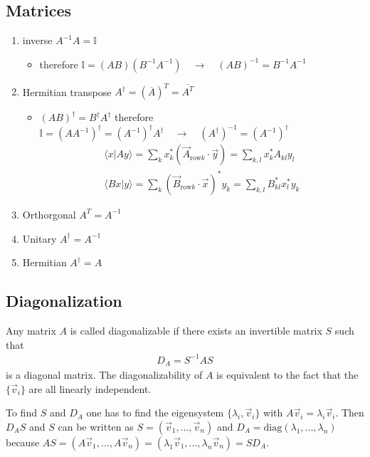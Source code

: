 \documentclass[10pt,a4paper]{article}
\theoremstyle{definition}
\begin{document}
\subsection{Matrices}
\begin{enumerate}
    \item inverse $A^{-1}A=\mathbb{I}$
    \begin{itemize}
        \item therefore $\mathbb{I}=(AB)(B^{-1}A^{-1})\quad\rightarrow\quad (AB)^{-1}=B^{-1}A^{-1}$
    \end{itemize}
    \item Hermitian transpose $A^\dagger = (\overline{A})^T = \overline{A^T}$
        \begin{itemize}
        \item $(AB)^\dagger=B^\dagger A^\dagger$ therefore $\mathbb{I}=(AA^{-1})^\dagger=(A^{-1})^\dagger A^\dagger\quad\rightarrow\quad (A^\dagger)^{-1}=(A^{-1})^\dagger$
        \begin{align}
        \langle x |A y\rangle=\sum_k x_k^* (\vec{A}_{\text{row}k}\cdot\vec{y})=\sum_{k,l} x_k^* A_{kl}y_l\\
        \langle Bx |y\rangle = \sum_k(\vec{B}_{\text{row}k}\cdot \vec{x})^*y_k= \sum_{k,l}B_{kl}^*x_l^*y_k
        \end{align}
    \end{itemize}
    \item Orthorgonal $A^T = A^{-1}$
    \item Unitary $A^\dagger = A^{-1}$
    \item Hermitian $A^\dagger = A$
\end{enumerate}

\subsection{Diagonalization}
Any  matrix $A$ is called diagonalizable if there exists an invertible matrix $S$ such that
\begin{align}
    D_A=S^{-1}AS
\end{align}
is a diagonal matrix. The diagonalizability of $A$ is equivalent to the fact that the $\{\vec{v}_i\}$ are all linearly independent.

To find $S$ and $D_A$ one has to find the eigensystem $\{\lambda_i,\vec{v}_i\}$ with $A\vec{v}_i=\lambda_i\vec{v}_i$. Then $D_AS$ and $S$ can be written as $S=(\vec{v}_1,...,\vec{v}_n)$ and $D_A=\text{diag}(\lambda_1,...,\lambda_n)$ because $AS=(A\vec{v}_1,...,A\vec{v}_n)=(\lambda_1\vec{v}_1,...,\lambda_n\vec{v}_n)=SD_A$.
\end{document}
